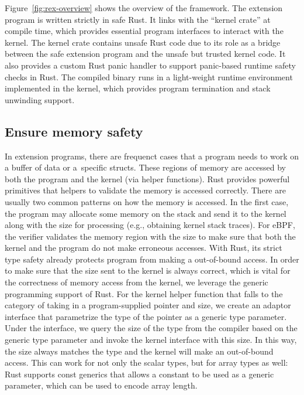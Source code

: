 Figure~\ref{fig:rex-overview} shows the overview of the \projname framework.
The extension program is written strictly in safe Rust.
It links with the ``kernel crate'' at compile time, which provides essential
    program interfaces to interact with the kernel.
The kernel crate contains unsafe Rust code due to its role as a bridge between
    the safe extension program and the unsafe but trusted kernel code.
It also provides a custom Rust panic handler to support panic-based runtime
    safety checks in Rust.
The compiled binary runs in a light-weight runtime environment implemented in
    the kernel, which provides program termination and stack unwinding support.

\subsection{Ensure memory safety}
In extension programs, there are
    frequenct cases that a program needs to work on a buffer of data or a\
    specific structs.
These regions of memory are accessed by both the program and the kernel (via
    helper functions).
Rust provides powerful primitives that helpers to validate the memory is
    accessed correctly.
There are usually two common patterns on how the memory is accessed.
In the first case, the program may allocate some memory on the stack and send
    it to the kernel along with the size for processing (e.g., obtaining kernel
    stack traces).
For eBPF, the verifier validates the memory region with the size to make sure
    that both the kernel and the program do not make erroneous accesses.
With Rust, its strict type safety already protects program from making a
    out-of-bound access.
In order to make sure that the size sent to the kernel is always correct, which
    is vital for the correctness of memory access from the kernel, we leverage
    the generic programming support of Rust.
For the kernel helper function that falls to the category of taking in a
    program-supplied pointer and size, we create an adaptor interface that
    parametrize the type of the pointer as a generic type parameter.
Under the interface, we query the size of the type from the compiler based on
    the generic type parameter and invoke the kernel interface with this size.
In this way, the size always matches the type and the kernel will make an
    out-of-bound access.
This can work for not only the scalar types, but for array types as well: Rust
    supports const generics that allows a constant to be used as a generic
    parameter, which can be used to encode array length.


